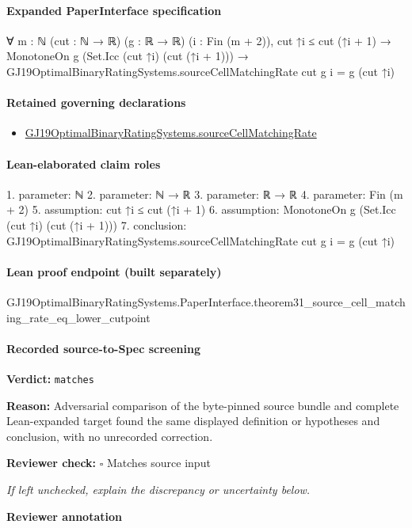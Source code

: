 \documentclass[10pt]{article}
\newcommand{\reviewerbox}{%
  \par\noindent\fbox{\parbox{0.96\linewidth}{\rule{0pt}{0.38in}}}\par
}
\newcommand{\reviewmatch}[1]{%
  \par\noindent\textbf{Reviewer check:} $\square$\; #1\par
  \noindent\emph{If left unchecked, explain the discrepancy or uncertainty below.}\par
}
\begin{document}
\paragraph{Expanded PaperInterface specification}
\begin{ReviewVerbatim}
∀ {m : ℕ} (cut : ℕ → ℝ) (g : ℝ → ℝ) (i : Fin (m + 2)),
  cut ↑i ≤ cut (↑i + 1) →
    MonotoneOn g (Set.Icc (cut ↑i) (cut (↑i + 1))) →
      GJ19OptimalBinaryRatingSystems.sourceCellMatchingRate cut g i = g (cut ↑i)
\end{ReviewVerbatim}

\paragraph{Retained governing declarations}
\begin{itemize}\raggedright
\item \hyperlink{governing-declaration-3685ee104d8de603}{GJ19\allowbreak{}Optimal\allowbreak{}Binary\allowbreak{}Rating\allowbreak{}Systems.\allowbreak{}source\allowbreak{}Cell\allowbreak{}Matching\allowbreak{}Rate}
\end{itemize}
\paragraph{Lean-elaborated claim roles}\begin{ReviewVerbatim}
1. parameter: ℕ
2. parameter: ℕ → ℝ
3. parameter: ℝ → ℝ
4. parameter: Fin (m + 2)
5. assumption: cut ↑i ≤ cut (↑i + 1)
6. assumption: MonotoneOn g (Set.Icc (cut ↑i) (cut (↑i + 1)))
7. conclusion: GJ19OptimalBinaryRatingSystems.sourceCellMatchingRate cut g i = g (cut ↑i)
\end{ReviewVerbatim}

\paragraph{Lean proof endpoint (built separately)}\begin{ReviewVerbatim}
GJ19OptimalBinaryRatingSystems.PaperInterface.theorem31_source_cell_matching_rate_eq_lower_cutpoint
\end{ReviewVerbatim}

\paragraph{Recorded source-to-Spec screening}
\textbf{Verdict:} \texttt{matches}
\\
{\raggedright
\textbf{Reason:} Adversarial comparison of the byte-\allowbreak{}pinned source bundle and complete Lean-\allowbreak{}expanded target found the same displayed definition or hypotheses and conclusion, with no unrecorded correction.\allowbreak{}
\par}
\reviewmatch{Matches source input}
\noindent\textbf{Reviewer annotation}\par
\reviewerbox
\clearpage
\hypertarget{source-claim-d2fd3442bfa83879}{}
\end{document}
